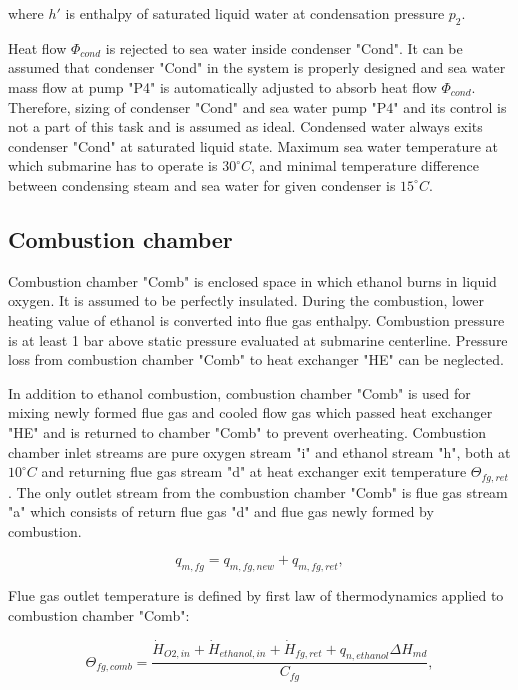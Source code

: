 \documentclass{article}
\begin{document}
	\noindent
	where $h'$ is enthalpy of saturated liquid water at condensation pressure $p_2$.
	
	\noindent
	Heat flow $\Phi_{cond}$ is rejected to sea water inside condenser "Cond". 
	It can be assumed that condenser "Cond" in the system is properly designed 
	and sea water mass flow at pump "P4" is automatically adjusted to absorb 
	heat flow $\Phi_{cond}$. Therefore, sizing of condenser "Cond" and sea 
	water pump "P4" and its control is not a part of this task and is assumed 
	as ideal. Condensed water always exits condenser "Cond" at saturated liquid 
	state.
	Maximum sea water temperature at which submarine has to operate is $30^{\circ}C$, and minimal temperature difference between condensing steam and sea water for given condenser is $15^{\circ}C$. 
	
	\subsection{Combustion chamber}
	
	Combustion chamber "Comb" is enclosed space in which ethanol burns in liquid oxygen. It is assumed to be perfectly insulated. During the combustion, lower heating value of ethanol is converted into flue gas enthalpy. Combustion pressure is at least 1 bar above static pressure evaluated at submarine centerline. Pressure loss from combustion chamber "Comb" to heat exchanger "HE" can be neglected.
	
	In addition to ethanol combustion, combustion chamber "Comb" is used for mixing newly formed flue gas and cooled flow gas which passed heat exchanger "HE" and is returned to chamber "Comb" to prevent overheating. Combustion chamber inlet streams are pure oxygen stream "i" and ethanol stream "h", both at $10^{\circ}C$ and returning flue gas stream "d" at heat exchanger exit temperature  $\Theta_{fg,ret}$. The only outlet stream from the combustion chamber "Comb" is flue gas stream "a" which consists of return flue gas "d" and flue gas newly formed by combustion. 
	
	\begin{equation}\label{eq:flue_gas_stream_new}
		q_{m,fg} = q_{m,fg,new} + q_{m,fg,ret},
	\end{equation}
	
	\noindent
	Flue gas outlet temperature is defined by first law of thermodynamics applied to combustion chamber "Comb":
	
	\begin{equation}\label{eq:flue_gas_out_temp}
		\Theta_{fg,comb} = \frac{\dot{H}_{O2,in} + \dot{H}_{ethanol,in} +\dot{H}_{fg,ret} + q_{n,ethanol} \Delta H_{md}}{C_{fg}},
	\end{equation}
	
\end{document}
